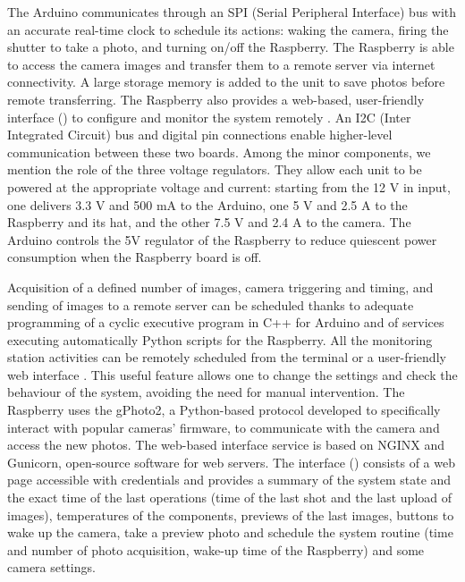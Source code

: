 The Arduino communicates through an SPI (Serial Peripheral Interface) bus with an
accurate real-time clock to schedule its actions: waking the camera, firing the shutter to take a photo, and turning on/off the Raspberry. 
The Raspberry is able to access the camera images and transfer them to a remote server via internet connectivity. 
A large storage memory is added to the unit to save photos before remote transferring. 
The Raspberry also provides a web-based, user-friendly interface
() to configure and monitor the system remotely
\citep{greig}.
An I2C (Inter Integrated Circuit) bus and digital pin connections enable higher-level
communication between these two boards. Among the minor components, we mention the role
of the three voltage regulators. They allow each unit to be powered at the appropriate
voltage and current: starting from the 12 V in input, one delivers 3.3 V and 500 mA to
the Arduino, one 5 V and 2.5 A to the Raspberry and its hat, and the other 7.5 V and 2.4
A to the camera. The Arduino controls the 5V regulator of the Raspberry to reduce
quiescent power consumption when the Raspberry board is off.

Acquisition of a defined number of images, camera triggering and timing, and sending of
images to a remote server can be scheduled thanks to adequate programming of a cyclic
executive program in C++ for Arduino and  of services executing automatically Python
scripts for the Raspberry.
All the monitoring station activities can be remotely scheduled from the terminal or a
user-friendly web interface \citep{greig}. This useful feature allows one to change the
settings and check the behaviour of the system, avoiding the need for manual
intervention. The Raspberry uses the gPhoto2, a Python-based protocol developed to
specifically interact with popular cameras’ firmware, to communicate with the camera and
access the new photos. The  web-based interface service is based on NGINX and Gunicorn,
open-source software for web servers. The interface ()
consists of a web page accessible with credentials and provides a summary of the system
state and the exact time of the last operations (time of the last shot and the last
upload of images), temperatures of the components, previews of the last images, buttons
to wake up the camera, take a preview photo and schedule the system routine (time and
number of photo acquisition, wake-up time of the Raspberry) and some camera settings.


